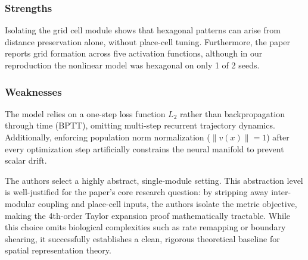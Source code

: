 \documentclass[10pt,letterpaper]{article}
\begin{document}
\subsubsection{Strengths}
Isolating the grid cell module shows that hexagonal patterns can arise from distance preservation alone, without place-cell tuning. Furthermore, the paper reports grid formation across five activation functions, although in our reproduction the nonlinear model was hexagonal on only 1 of 2 seeds.
\subsubsection{Weaknesses}
The model relies on a one-step loss function $L_2$ rather than backpropagation through time (BPTT), omitting multi-step recurrent trajectory dynamics. Additionally, enforcing population norm normalization ($\|v(x)\|=1$) after every optimization step artificially constrains the neural manifold to prevent scalar drift.

The authors select a highly abstract, single-module setting. This abstraction level is well-justified for the paper's core research question: by stripping away inter-modular coupling and place-cell inputs, the authors isolate the metric objective, making the 4th-order Taylor expansion proof mathematically tractable. While this choice omits biological complexities such as rate remapping or boundary shearing, it successfully establishes a clean, rigorous theoretical baseline for spatial representation theory.
\end{document}
